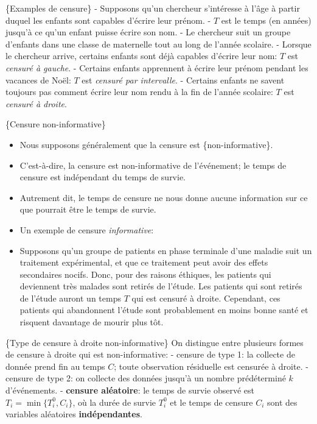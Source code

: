 \documentclass[
  11pt,
  letterpaper,
]{article}
\theoremstyle{definition}
\theoremstyle{definition}
\theoremstyle{definition}
\theoremstyle{definition}
\theoremstyle{remark}
\begin{document}
\{Examples de censure\}
- Supposons qu'un chercheur s'intéresse à l'âge à partir duquel les enfants sont capables d'écrire leur prénom.
- \(T\) est le temps (en années) jusqu'à ce qu'un enfant puisse écrire son nom.
- Le chercheur suit un groupe d'enfants dans une classe de maternelle tout au long de l'année scolaire.
- Lorsque le chercheur arrive, certains enfants sont déjà capables d'écrire leur nom: \(T\) est \emph{censuré à gauche}.
- Certains enfants apprennent à écrire leur prénom pendant les vacances de Noël: \(T\) est \emph{censuré par intervalle}. - Certains enfants ne savent toujours pas comment écrire leur nom rendu à la fin de l'année scolaire: \(T\) est \emph{censuré à droite}.

\{Censure non-informative\}

\begin{itemize}
\item
  Nous supposons généralement que la censure est \{non-informative\}.
\item
  C'est-à-dire, la censure est non-informative de l'événement; le temps de censure est indépendant du temps de survie.
\item
  Autrement dit, le temps de censure ne nous donne aucune information sur ce que pourrait être le temps de survie.
\item
  Un exemple de censure \emph{informative}:
\item
  Supposons qu'un groupe de patients en phase terminale d'une maladie suit un traitement expérimental, et que ce traitement peut avoir des effets secondaires nocifs. Donc, pour des raisons éthiques, les patients qui deviennent très malades sont retirés de l'étude. Les patients qui sont retirés de l'étude auront un temps \(T\) qui est censuré à droite. Cependant, ces patients qui abandonnent l'étude sont probablement en moins bonne santé et risquent davantage de mourir plus tôt.
\end{itemize}

\{Type de censure à droite non-informative\}
On distingue entre plusieurs formes de censure à droite qui est non-informative:
- censure de type 1: la collecte de donnée prend fin au temps \(C\); toute observation résiduelle est censurée à droite.
- censure de type 2: on collecte des données jusqu'à un nombre prédéterminé \(k\) d'événements.
- \textbf{censure aléatoire}: le temps de survie observé est \(T_i = \min\{T_i^0, C_i\}\), où la durée de survie \(T_i^0\) et le temps de censure \(C_i\) sont des variables aléatoires \textbf{indépendantes}.
\end{document}
